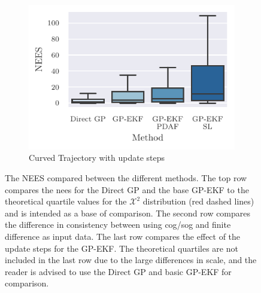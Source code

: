 \begin{figure}
{\begin{subfigure}{0.6\textwidth}
            \includegraphics{figures/curved_line_stats/nees.pdf}
            \caption{Curved Trajectory with update steps}
            \label{fig:stats_curved_nees_update}
        \end{subfigure}
    }

    \caption{The NEES compared between the different methods. The top row compares the \acrshort{nees} for the Direct GP and the base GP-EKF to the theoretical quartile values for the $\mathcal{X}^2$ distribution (red dashed lines) and is intended as a base of comparison. The second row compares the difference in consistency between using \acrshort{cog}/\acrshort{sog} and finite difference as input data. The last row compares the effect of the update steps for the GP-EKF. The theoretical quartiles are not included in the last row due to the large differences in scale, and the reader is advised to use the Direct GP and basic GP-EKF for comparison.}

\end{figure}






